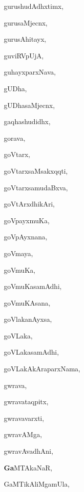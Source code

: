 \begin{multicols}{3}
{\noindent
{gurushudAdhxtimx}, \pageref{gurushudAdhxtimx}

\noindent
{gurusaMjecnx}, \pageref{gurusaMjecnx}

\noindent
{gurusAhitayx}, \pageref{gurusAhitayx}

\noindent
{guviRVpUjA}, \pageref{guviRVpUjA}

\noindent
{guhayxparxNava}, \pageref{guhayxparxNava}

\noindent
{gUDha}, \pageref{gUDha}

\noindent
{gUDhasaMjecnx}, \pageref{gUDhasaMjecnx}

\noindent
{gaqhashudidhx}, \pageref{gaqhashudidhx}

\noindent
{gorava}, \pageref{gorava}

\noindent
{goVtarx}, \pageref{goVtarx}

\noindent
{goVtarxsaMsakxqqti}, \pageref{goVtarxsaMsakxqqti}

\noindent
{goVtarxsamudaBxva}, \pageref{goVtarxsamudaBxva}

\noindent
{goVtArxdhikAri}, \pageref{goVtArxdhikAri}

\noindent
{goVpayxmuKa}, \pageref{goVpayxmuKa}

\noindent
{goVpAyxnana}, \pageref{goVpAyxnana}

\noindent
{goVmaya}, \pageref{goVmaya}

\noindent
{goVmuKa}, \pageref{goVmuKa}

\noindent
{goVmuKasamAdhi}, \pageref{goVmuKasamAdhi}

\noindent
{goVmuKAsana}, \pageref{goVmuKAsana}

\noindent
{goVlakanAyxsa}, \pageref{goVlakanAyxsa}

\noindent
{goVLaka}, \pageref{goVLaka}

\noindent
{goVLakasamAdhi}, \pageref{goVLakasamAdhi}

\noindent
{goVLakAkAraparxNama}, \pageref{goVLakAkAraparxNama}

\noindent
{gwrava}, \pageref{gwrava}

\noindent
{gwravataqpitx}, \pageref{gwravataqpitx}

\noindent
{gwravavarxti}, \pageref{gwravavarxti}

\noindent
{gwravAMga}, \pageref{gwravAMga}

\noindent
{gwravAvadhAni}, \pageref{gwravAvadhAni}

\noindent
{{\large\textbf{Ga}}MTAkaNaR}, \pageref{GaMTAkaNaR}

\noindent
{GaMTikAliMgamUla}, \pageref{GaMTikAliMgamUla}

}
\end{multicols}
